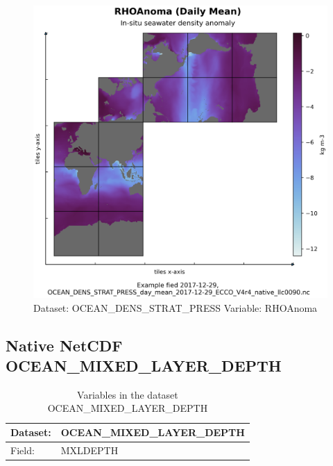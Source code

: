 \begin{figure}[H]
\centering
\includegraphics[width=\textwidth]{../images/plots/native_plots/Ocean_Density_Stratification_and_Hydrostatic_Pressure/RHOAnoma.png}
\caption{Dataset: OCEAN\_DENS\_STRAT\_PRESS Variable: RHOAnoma}
\label{tab:table-OCEAN_DENS_STRAT_PRESS_RHOAnoma-Plot}
\end{figure}
\pagebreak
\subsection{Native NetCDF OCEAN\_MIXED\_LAYER\_DEPTH}
\newp
\begin{longtable}{|p{}|p{}|}
\caption{Variables in the dataset OCEAN\_MIXED\_LAYER\_DEPTH}
\label{tab:table-OCEAN_MIXED_LAYER_DEPTH-fields} \\ 
\hline \endhead \hline \endfoot
\rowcolor{lightgray} \textbf{Dataset:} & \textbf{OCEAN\_MIXED\_LAYER\_DEPTH} \\ \hline
Field: &MXLDEPTH \\ \hline
\end{longtable}

\pagebreak
